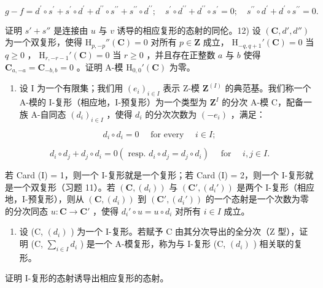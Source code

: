 \[
g - f = d ^ {\prime} \circ s ^ {\prime} + s ^ {\prime} \circ d ^ {\prime} + d ^ {\prime \prime} \circ s ^ {\prime \prime} + s ^ {\prime \prime} \circ d ^ {\prime \prime}; \quad s ^ {\prime} \circ d ^ {\prime \prime} + d ^ {\prime \prime} \circ s ^ {\prime} = 0; \quad s ^ {\prime \prime} \circ d ^ {\prime} + d ^ {\prime} \circ s ^ {\prime \prime} = 0.
\]

证明 \(s' + s''\) 是连接由 \(u\) 与 \(v\) 诱导的相应复形的态射的同伦。12) 设 \((\mathbf{C}, d', d'')\) 为一个双复形，使得 \(\mathrm{H}_{p,-p}''(\mathbf{C}) = 0\) 对所有 \(p \in \mathbf{Z}\) 成立， \(\mathrm{H}_{-q,q+1}'(\mathbf{C}) = 0\) 当 \(q \geqslant 0\) ， \(\mathrm{H}_{r,-r-1}'(\mathbf{C}) = 0\) 当 \(r \geqslant 0\) ，并且存在正整数 \(a\) 与 \(b\) 使得 \(\mathbf{C}_{a,-a} = \mathbf{C}_{-b,b} = 0\) 。证明 A-模 \(\mathrm{H}_{0,0}'(\mathbf{C})\) 为零。

\begin{enumerate}
\def\labelenumi{\arabic{enumi})}
\setcounter{enumi}{12}
\tightlist
\item
  设 I 为一个有限集；我们用 \((e_i)_{i\in I}\) 表示 Z-模 \(\mathbf{Z}^{(I)}\) 的典范基。我们称一个 A-模的 I-复形（相应地，I-预复形）为一个类型为 \(\mathbf{Z}^{I}\) 的分次 A-模 C，配备一族 A-自同态 \((d_i)_{i\in I}\) ，使得 \(d_i\) 的分次次数为 \((-e_i)\) ，满足：
\end{enumerate}

\[
d _ {i} \circ d _ {i} = 0 \quad \text { for every } \quad i \in I;
\]

\[
d _ {i} \circ d _ {j} + d _ {j} \circ d _ {i} = 0 (\text { resp. } d _ {i} \circ d _ {j} = d _ {j} \circ d _ {i}) \quad \text { for } \quad i, j \in I.
\]

若 Card (I) = 1，则一个 I-复形就是一个复形；若 Card (I) = 2，则一个 I-复形就是一个双复形（习题 11）。若 \((\mathbf{C}, (d_i))\) 与 \((\mathbf{C}', (d_i'))\) 是两个 I-复形（相应地，I-预复形），则从 \((\mathbf{C}, (d_i))\) 到 \((\mathbf{C}', (d_i'))\) 的一个态射是一个次数为零的分次同态 \(u: \mathbf{C} \to \mathbf{C}'\) ，使得 \(d_i' \circ u = u \circ d_i\) 对所有 \(i \in I\) 成立。

\begin{enumerate}
\def\labelenumi{\alph{enumi})}
\tightlist
\item
  设 (C, \((d_i)\) ) 为一个 I-复形。若赋予 C 由其分次导出的全分次（Z 型），证明 (C, \(\sum_{i\in I}d_i\) ) 是一个 A-模复形，称为与 I-复形 (C, \((d_i)\) ) 相关联的复形。
\end{enumerate}

证明 I-复形的态射诱导出相应复形的态射。

